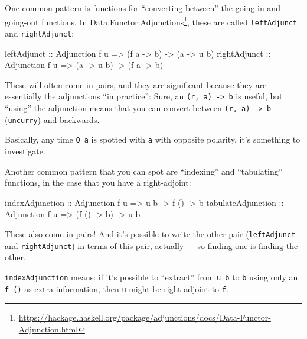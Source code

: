 \documentclass[]{article}
\newenvironment{Shaded}{}{}
\newcommand{\DataTypeTok}[1]{\textcolor[rgb]{0.56,0.13,0.00}{#1}}
\newcommand{\NormalTok}[1]{#1}
\newcommand{\OtherTok}[1]{\textcolor[rgb]{0.00,0.44,0.13}{#1}}
\renewcommand{\href}[2]{#2\footnote{\url{#1}}}
\begin{document}
One common pattern is functions for ``converting between'' the going-in and
going-out functions. In
\href{https://hackage.haskell.org/package/adjunctions/docs/Data-Functor-Adjunction.html}{Data.Functor.Adjunctions},
these are called \texttt{leftAdjunct} and \texttt{rightAdjunct}:

\begin{Shaded}
\begin{Highlighting}[]
\OtherTok{leftAdjunct  ::} \DataTypeTok{Adjunction}\NormalTok{ f u }\OtherTok{=>}\NormalTok{ (f a }\OtherTok{{-}>}\NormalTok{ b) }\OtherTok{{-}>}\NormalTok{ (a }\OtherTok{{-}>}\NormalTok{ u b)}
\OtherTok{rightAdjunct ::} \DataTypeTok{Adjunction}\NormalTok{ f u }\OtherTok{=>}\NormalTok{ (a }\OtherTok{{-}>}\NormalTok{ u b) }\OtherTok{{-}>}\NormalTok{ (f a }\OtherTok{{-}>}\NormalTok{ b)}
\end{Highlighting}
\end{Shaded}

These will often come in pairs, and they are significant because they are
essentially the adjunctions ``in practice'': Sure, an
\texttt{(r,\ a)\ -\textgreater{}\ b} is useful, but ``using'' the adjunction
means that you can convert between \texttt{(r,\ a)\ -\textgreater{}\ b}
(\texttt{uncurry}) and backwards.

Basically, any time \texttt{Q\ a} is spotted with \texttt{a} with opposite
polarity, it's something to investigate.

Another common pattern that you can spot are ``indexing'' and ``tabulating''
functions, in the case that you have a right-adjoint:

\begin{Shaded}
\begin{Highlighting}[]
\OtherTok{indexAdjunction    ::} \DataTypeTok{Adjunction}\NormalTok{ f u }\OtherTok{=>}\NormalTok{ u b }\OtherTok{{-}>}\NormalTok{ f () }\OtherTok{{-}>}\NormalTok{ b}
\OtherTok{tabulateAdjunction ::} \DataTypeTok{Adjunction}\NormalTok{ f u }\OtherTok{=>}\NormalTok{ (f () }\OtherTok{{-}>}\NormalTok{ b) }\OtherTok{{-}>}\NormalTok{ u b}
\end{Highlighting}
\end{Shaded}

These also come in pairs! And it's possible to write the other pair
(\texttt{leftAdjunct} and \texttt{rightAdjunct}) in terms of this pair, actually
--- so finding one is finding the other.

\texttt{indexAdjunction} means: if it's possible to ``extract'' from
\texttt{u\ b} to \texttt{b} using only an \texttt{f\ ()} as extra information,
then \texttt{u} might be right-adjoint to \texttt{f}.
\end{document}
